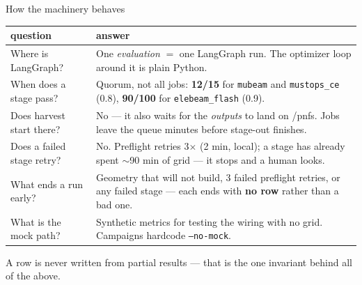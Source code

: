 \documentclass[aspectratio=169,10pt]{beamer}
\begin{document}
\begin{frame}{How the machinery behaves}
\small
\begin{tabular}{@{}p{}p{}@{}}
\toprule
question & answer \\
\midrule
Where is LangGraph? &
One \emph{evaluation} $=$ one LangGraph run. The optimizer loop around it is plain Python. \\[3pt]

When does a stage pass? &
Quorum, not all jobs: \textbf{12/15} for \texttt{mubeam} and \texttt{mustops\_ce} (0.8),
\textbf{90/100} for \texttt{elebeam\_flash} (0.9). \\[3pt]

Does harvest start there? &
No --- it also waits for the \emph{outputs} to land on /pnfs. Jobs leave the queue minutes
before stage-out finishes. \\[3pt]

Does a failed stage retry? &
No. Preflight retries 3$\times$ (2 min, local); a stage has already spent $\sim$90 min of grid
--- it stops and a human looks. \\[3pt]

What ends a run early? &
Geometry that will not build, 3 failed preflight retries, or any failed stage --- each ends
with \textbf{no row} rather than a bad one. \\[3pt]

What is the mock path? &
Synthetic metrics for testing the wiring with no grid. Campaigns hardcode \texttt{--no-mock}. \\
\bottomrule
\end{tabular}
\vspace{0.6em}

{\footnotesize A row is never written from partial results --- that is the one invariant
behind all of the above.}
\end{frame}
\end{document}
